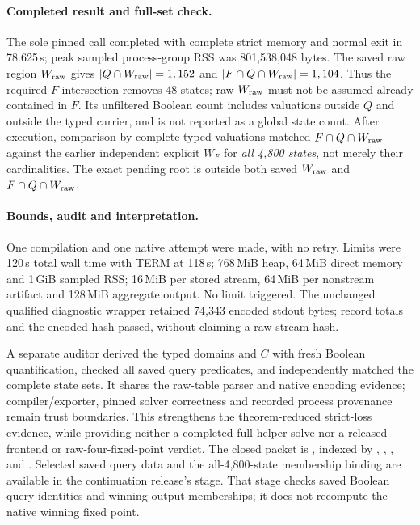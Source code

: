 \paragraph{Completed result and full-set check.}
The sole pinned  call completed with complete strict memory
and normal exit in 78.625\,s; peak sampled process-group RSS was
801,538,048 bytes. The saved raw region $W_{\rm raw}$ gives $|Q\cap W_{\rm raw}|=1,152$ and
$|F\cap Q\cap W_{\rm raw}|=1,104$. Thus the required $F$ intersection removes
48 states; raw $W_{\rm raw}$ must not be assumed already contained in $F$.
Its unfiltered Boolean count includes valuations outside $Q$ and outside
the typed carrier, and is not reported as a global state count.
After execution, comparison by complete typed valuations matched
$F\cap Q\cap W_{\rm raw}$ against the earlier independent explicit $W_F$ for
\emph{all 4,800 states}, not merely their cardinalities. The exact pending
root is outside both saved $W_{\rm raw}$ and $F\cap Q\cap W_{\rm raw}$.

\paragraph{Bounds, audit and interpretation.}
One compilation and one native attempt were made, with no retry. Limits
were 120\,s total wall time with TERM at 118\,s; 768\,MiB heap,
64\,MiB direct memory and 1\,GiB sampled RSS; 16\,MiB per stored
stream, 64\,MiB per nonstream artifact and 128\,MiB aggregate output.
No limit triggered. The unchanged qualified diagnostic wrapper retained
74,343 encoded stdout bytes; record totals and the encoded hash passed,
without claiming a raw-stream hash.

A separate auditor derived the typed domains and $C$ with fresh Boolean
quantification, checked all saved query predicates, and independently
matched the complete state sets. It shares the raw-table parser and
native encoding evidence; compiler/exporter, pinned solver correctness
and recorded process provenance remain trust boundaries. This strengthens
the theorem-reduced strict-loss evidence, while providing neither a
completed full-helper solve nor a released-frontend or raw-four-fixed-point
verdict. The closed packet is
, indexed by
, , ,
 and .
Selected saved query data and the all-4,800-state membership
binding are available in the continuation release's  stage.
That stage checks saved Boolean query identities and winning-output
memberships; it does not recompute the native winning fixed point.


